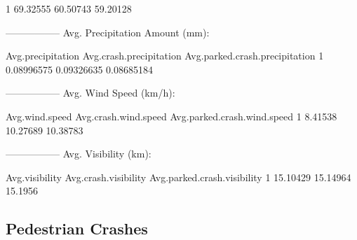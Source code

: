 \documentclass[11pt, a4paper]{article}
\begin{document}
\begin{Schunk}
\begin{Soutput}
1     69.32555           60.50743                  59.20128
\end{Soutput}
\begin{Soutput}
-----------------
Avg. Precipitation Amount (mm):
\end{Soutput}
\begin{Soutput}
  Avg.precipitation Avg.crash.precipitation Avg.parked.crash.precipitation
1        0.08996575              0.09326635                     0.08685184
\end{Soutput}
\begin{Soutput}
-----------------
Avg. Wind Speed (km/h):
\end{Soutput}
\begin{Soutput}
  Avg.wind.speed Avg.crash.wind.speed Avg.parked.crash.wind.speed
1        8.41538             10.27689                    10.38783
\end{Soutput}
\begin{Soutput}
-----------------
Avg. Visibility (km):
\end{Soutput}
\begin{Soutput}
  Avg.visibility Avg.crash.visibility Avg.parked.crash.visibility
1       15.10429             15.14964                     15.1956
\end{Soutput}
\end{Schunk}



\pagebreak
\subsection{Pedestrian Crashes}
\end{document}
